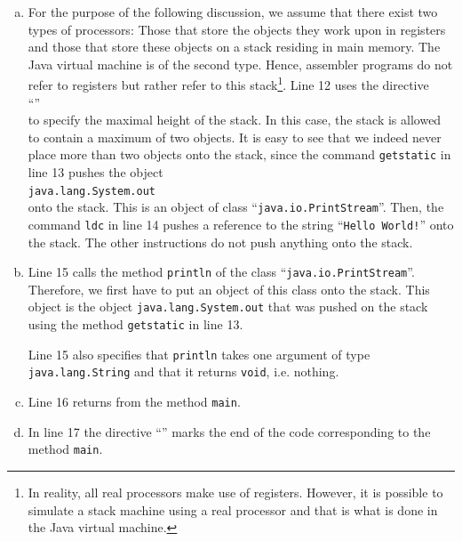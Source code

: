 \begin{enumerate}
\begin{enumerate}[(a)]
  \item For the purpose of the following discussion, we assume that there exist two types of
        processors: Those that store the objects they work upon in registers and those that store
        these objects on a stack residing in main memory.  The Java virtual machine is of the second
        type.  Hence,  assembler programs do not refer to registers but rather refer to
        this stack\footnote{
          In reality, all real processors make use of registers.  However, it is possible 
          to simulate a stack machine using a real processor and that is what is done in the Java
          virtual machine.}.
        Line 12 uses the directive
        \\[0.2cm]
        \hspace*{1.3cm}
        ``\texttt{}''
        \\[0.2cm]
        to specify the maximal height of the
        stack.  In this case, the stack is allowed to contain a maximum of two objects.  It is easy
        to see that we indeed never place more than two objects onto the stack, since the command
        \texttt{getstatic} in line 13 pushes the object 
        \\[0.2cm]
        \hspace*{1.3cm}
        \texttt{java.lang.System.out}
        \\[0.2cm]
        onto the stack.  This is an object of class ``\texttt{java.io.PrintStream}''.
        Then, the command \texttt{ldc} in line 14 pushes a reference to the string ``\texttt{Hello World!}'' onto the stack.
        The other instructions do not push anything onto the stack.
  \item Line 15 calls the method \texttt{println} of the class ``\texttt{java.io.PrintStream}''.
        Therefore, we first have to put an object of this class onto the stack.  This object is the object
        \texttt{java.lang.System.out} that was  pushed on the stack using the method \texttt{getstatic} in
        line 13.

        Line 15 also specifies that \texttt{println} takes one argument of
        type \texttt{java.lang.String} and that it returns \texttt{void}, i.e. nothing.

  \item Line 16 returns from the method \texttt{main}.
  \item In line 17 the directive ``\texttt{}''  marks the end of the code corresponding to the method 
        \texttt{main}.
  \end{enumerate}
\end{enumerate}
